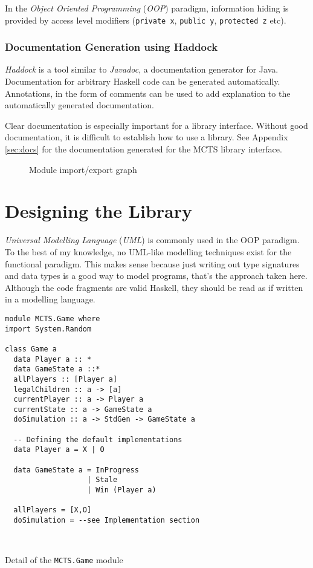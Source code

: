 In the \textit{Object Oriented Programming} (\textit{OOP}) paradigm, information hiding is provided by access level modifiers (\texttt{private x}, \verb|public y|, \verb|protected z| etc). 

\subsubsection{Documentation Generation using Haddock}
\textit{Haddock} is a tool similar to \textit{Javadoc}, a documentation generator for Java. Documentation for arbitrary  Haskell code can be generated automatically. Annotations, in the form of comments can be used to add explanation to the automatically generated documentation. 

Clear documentation is especially important for a library interface. Without good documentation, it is difficult to establish how to use a library. See Appendix \ref{sec:docs} for the documentation generated for the MCTS library interface. 

\begin{figure}[]
\centering
\scalebox{0.8}{}

\caption{\label{fig:uml}Module import/export graph}
\end{figure}
\section{Designing the Library\label{sec:prepdes}}

\textit{Universal Modelling Language} (\textit{UML}) is commonly used in the {OOP} paradigm. To the best of my knowledge, no {UML}-like modelling techniques exist for the functional paradigm. This makes sense because just writing out type signatures and data types is a good way to model programs, that's the approach taken here. Although the code fragments are valid {Haskell}, they should be read as if written in a modelling language.


\begin{fragment}
\begin{lstlisting}
module MCTS.Game where
import System.Random

class Game a
  data Player a :: *
  data GameState a ::*
  allPlayers :: [Player a]
  legalChildren :: a -> [a]
  currentPlayer :: a -> Player a
  currentState :: a -> GameState a
  doSimulation :: a -> StdGen -> GameState a
  
  -- Defining the default implementations
  data Player a = X | O
  
  data GameState a = InProgress 
                   | Stale
                   | Win (Player a)
                   
  allPlayers = [X,O]
  doSimulation = --see Implementation section
  


\end{lstlisting}
\caption{Detail of the \texttt{MCTS.Game} module}
\label{frag:module_game}
\end{fragment}



